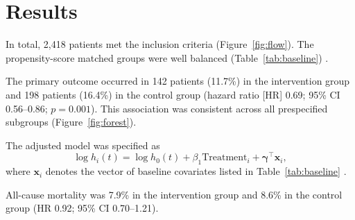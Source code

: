 \section{Results}
\label{sec:results}

In total, 2,418 patients met the inclusion criteria (Figure~\ref{fig:flow}). The propensity-score matched groups were well balanced (Table~\ref{tab:baseline}) \cite{austin2011introduction}.

The primary outcome occurred in 142 patients (11.7\%) in the intervention group and 198 patients (16.4\%) in the control group (hazard ratio [HR] 0.69; 95\% CI 0.56--0.86; $p = 0.001$). This association was consistent across all prespecified subgroups (Figure~\ref{fig:forest}).

The adjusted model was specified as
\begin{equation}
  \log h_i(t) = \log h_0(t) + \beta_1 \text{Treatment}_i + \boldsymbol{\gamma}^\top \mathbf{x}_i ,
  \label{eq:cox}
\end{equation}
where $\mathbf{x}_i$ denotes the vector of baseline covariates listed in Table~\ref{tab:baseline} \cite{cox1972regression, therneau2000modeling}.

All-cause mortality was 7.9\% in the intervention group and 8.6\% in the control group (HR 0.92; 95\% CI 0.70--1.21).
